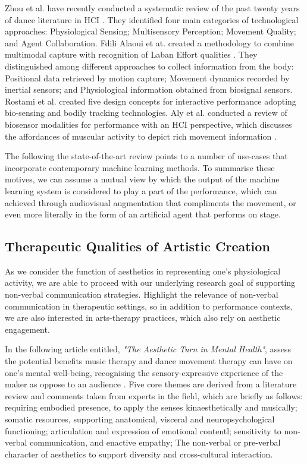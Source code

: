 

Zhou et al. have recently conducted a systematic review of the past twenty years of dance literature in HCI \cite{zhou_dance_2021}. They identified four main categories of technological approaches: Physiological Sensing; Multisensory Perception; Movement Quality; and Agent Collaboration. Fdili Alaoui et at. created a methodology to combine multimodal capture with recognition of Laban Effort qualities \cite{fdili_alaoui_seeing_2017}. They distinguished among different approaches to collect information from the body: Positional data retrieved by motion capture; Movement dynamics recorded by inertial sensors; and Physiological information obtained from biosignal sensors. Rostami et al. \cite{rostami_bio-sensed_2017} created five design concepts for interactive performance adopting bio-sensing and bodily tracking technologies. Aly et al. conducted a review of biosensor modalities for performance with an HCI perspective, which discusses the affordances of muscular activity to depict rich movement information \cite{aly_appropriating_2021}.

The following the state-of-the-art review points to a number of use-cases that incorporate contemporary machine learning methods. To summarise these motives, we can assume a mutual view by which the output of the machine learning system is considered to play a part of the performance, which can achieved through audiovisual augmentation that compliments the movement, or even more literally in the form of an artificial agent that performs on stage.

\subsection{Therapeutic Qualities of Artistic Creation}

As we consider the function of aesthetics in representing one's physiological activity, we are able to proceed with our underlying research goal of supporting non-verbal communication strategies. Highlight the relevance of non-verbal communication in therapeutic settings, so in addition to performance contexts, we are also interested in arts-therapy practices, which also rely on aesthetic engagement.

In the following article entitled, \textit{"The Aesthetic Turn in Mental Health"}, \citeauthor{samaritter_aesthetic_2018} assess the potential benefits music therapy and dance movement therapy can have on one's mental well-being, recognising the sensory-expressive experience of the maker as oppose to an audience \cite{samaritter_aesthetic_2018}. Five core themes are derived from a literature review and comments taken from experts in the field, which are briefly as follows: requiring embodied presence, to apply the senses kinaesthetically and musically; somatic resources, supporting anatomical, visceral and neuropsychological functioning; articulation and expression of emotional contentl; sensitivity to non-verbal communication, and enactive empathy; The non-verbal or pre-verbal character of aesthetics to support diversity and cross-cultural interaction.

